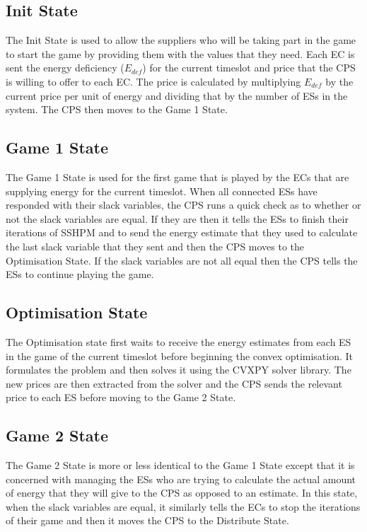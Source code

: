 \documentclass[a4paper, notitlepage]{report}
\begin{document}
\subsection{Init State}
\label{sec:org9b437dd}
The Init State is used to allow the suppliers who will be taking part in the
game to start the game by providing them with the values that they need. Each EC
is sent the energy deficiency (\(E_{def}\)) for the current timeslot and price that
the CPS is willing to offer to each EC. The price is calculated by multiplying
\(E_{def}\) by the current price per unit of energy and dividing that by the
number of ESs in the system. The CPS then moves to the Game 1 State.
\subsection{Game 1 State}
\label{sec:org5d713b5}
The Game 1 State is used for the first game that is played by the ECs that are
supplying energy for the current timeslot. When all connected ESs have responded
with their slack variables, the CPS runs a quick check as to whether or not the
slack variables are equal. If they are then it tells the ESs to finish their
iterations of SSHPM and to send the energy estimate that they used to calculate
the last slack variable that they sent and then the CPS moves to the
Optimisation State. If the slack variables are not all equal then the CPS tells
the ESs to continue playing the game.
\subsection{Optimisation State}
\label{sec:orgd591609}
The Optimisation state first waits to receive the energy estimates from each ES
in the game of the current timeslot before beginning the convex optimisation. It
formulates the problem and then solves it using the CVXPY \cite{diamond2016cvxpy}
solver library. The new prices are then extracted from the solver and the CPS
sends the relevant price to each ES before moving to the Game 2 State.
\subsection{Game 2 State}
\label{sec:org33a97c4}
The Game 2 State is more or less identical to the Game 1 State except that it is
concerned with managing the ESs who are trying to calculate the actual amount of
energy that they will give to the CPS as opposed to an estimate. In this state,
when the slack variables are equal, it similarly tells the ECs to stop the
iterations of their game and then it moves the CPS to the Distribute State.
\end{document}
